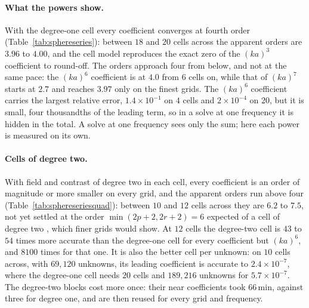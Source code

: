 \documentclass[11pt,a4paper]{article}
\begin{document}
\paragraph{What the powers show.} With the degree-one cell every coefficient converges at fourth order
(Table~\ref{tab:sphereseries}): between $18$ and $20$ cells across the apparent orders are $3.96$ to $4.00$,
and the cell model reproduces the exact zero of the $(ka)^3$ coefficient to round-off. The orders approach
four from below, and not at the same pace: the $(ka)^6$ coefficient is at $4.0$ from $6$ cells on, while that
of $(ka)^7$ starts at $2.7$ and reaches $3.97$ only on the finest grids. The $(ka)^6$ coefficient carries the
largest relative error, $1.4\times10^{-1}$ on $4$ cells and $2\times10^{-4}$ on $20$, but it is small, four
thousandths of the leading term, so in a solve at one frequency it is hidden in the total. A solve at one
frequency sees only the sum; here each power is measured on its own.

\paragraph{Cells of degree two.} With field and contrast of degree two in each cell, every coefficient is
an order of magnitude or more smaller on every grid, and the apparent orders run above four
(Table~\ref{tab:sphereseriesquad}): between $10$ and $12$ cells across they are $6.2$ to $7.5$, not yet settled
at the order $\min(2p+2,2r+2)=6$ expected of a cell of degree two \citep{NestorError2026}, which finer grids
would show. At $12$ cells the degree-two cell is $43$ to $54$ times more accurate than the
degree-one cell for every coefficient but $(ka)^6$, and $8100$ times for that one. It is also the better
cell per unknown: on $10$ cells across, with $69{,}120$ unknowns, its leading coefficient is accurate to
$2.4\times10^{-7}$, where the degree-one cell needs $20$ cells and $189{,}216$ unknowns for
$5.7\times10^{-7}$. The degree-two blocks cost more once: their near coefficients took $66$\,min, against
three for degree one, and are then reused for every grid and frequency.
\end{document}
